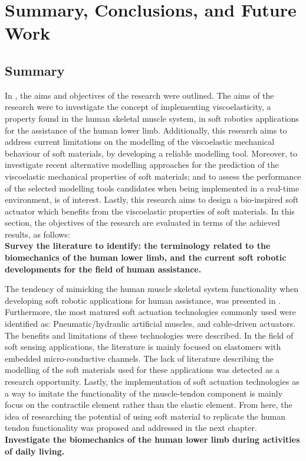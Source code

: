 \chapter{Summary, Conclusions, and Future Work}

\section{Summary}

In , the aims and objectives of the research were outlined. The aims of the research were to investigate the concept of implementing viscoelasticity, a property found in the human skeletal muscle system, in soft robotics applications for the assistance of the human lower limb. Additionally, this research aims to address current limitations on the modelling of the viscoelastic mechanical behaviour of soft materials, by developing a reliable modelling tool. Moreover, to investigate recent alternative modelling approaches for the prediction of the viscoelastic mechanical properties of soft materials; and to assess the performance of the selected modelling tools candidates when being implemented in a real-time environment, is of interest. Lastly, this research aims to design a bio-inspired soft actuator which benefits from the viscoelastic properties of soft materials. In this section, the objectives of the research are evaluated in terms of the achieved results, as follows:
\\[1em]
\noindent \textbf{ \large{ Survey the literature to identify: the terminology related to the biomechanics of the human lower limb, and the current soft robotic developments for the field of human assistance.}}

The tendency of mimicking the human muscle skeletal system functionality when developing soft robotic applications for human assistance, was presented in . Furthermore, the most matured soft actuation technologies commonly used were identified as: Pneumatic/hydraulic artificial muscles, and cable-driven actuators. The benefits and limitations of these technologies were described. In the field of soft sensing applications, the literature is mainly focused on elastomers with embedded micro-conductive channels. The lack of literature describing the modelling of the soft materials used for these applications was detected as a research opportunity. Lastly, the implementation of soft actuation technologies as a way to imitate the functionality of the muscle-tendon component is mainly focus on the contractile element rather than the elastic element. From here, the idea of researching the potential of using soft material to replicate the human tendon functionality was proposed and addressed in the next chapter.
\\[1em]
\noindent \textbf{\large{  Investigate the biomechanics of the human lower limb during activities of daily living.}}

